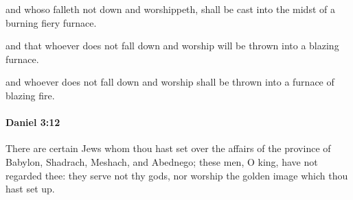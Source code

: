 			\begin{versebox}
					\item[BHS] 
					\item[LXX] 
					\item[ASV] and whoso falleth not down and worshippeth, shall be cast into the midst of a burning fiery furnace.
					\item[NIV] and that whoever does not fall down and worship will be thrown into a blazing furnace.
					\item[NRSV] and whoever does not fall down and worship shall be thrown into a furnace of blazing fire.
			\end{versebox}

		\paragraph{Daniel 3:12} %
			\label{DANIEL-3-12}

			There are certain Jews whom thou hast set over the affairs of the province of Babylon, Shadrach, Meshach, and Abednego; these men, O king, have not regarded thee: they serve not thy gods, nor worship the golden image which thou hast set up.

